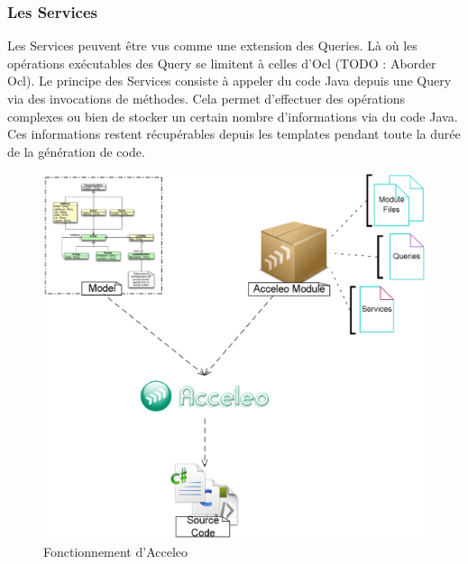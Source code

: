\subsubsection{Les Services}

Les Services peuvent être vus comme une extension des Queries. Là où les opérations exécutables des Query se limitent à celles d'Ocl (TODO : Aborder Ocl). Le principe des Services consiste à appeler du code Java depuis une Query via des invocations de méthodes. Cela permet d'effectuer des opérations complexes ou bien de stocker un certain nombre d'informations via du code Java. Ces informations restent récupérables depuis les templates pendant toute la durée de la génération de code.


\begin{figure}[htb]
  \centering
  \includegraphics[scale=0.29]{img/acceleo_scheme.eps}
  \caption{Fonctionnement d'Acceleo}
  \label{fig:acceleo}
\end{figure}

%


\newpage

 



